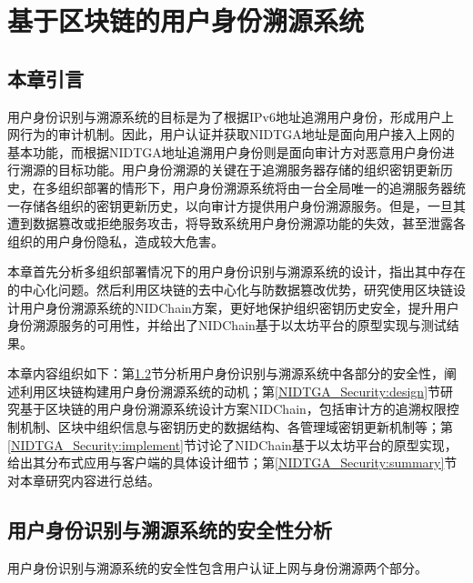 
\chapter{基于区块链的用户身份溯源系统}
\label{NIDTGA_Security}

  \section{本章引言}
  \label{NIDTGA_Security:introduction}
  用户身份识别与溯源系统的目标是为了根据IPv6地址追溯用户身份，形成用户上网行为的审计机制。因此，用户认证并获取NIDTGA地址是面向用户接入上网的基本功能，而根据NIDTGA地址追溯用户身份则是面向审计方对恶意用户身份进行溯源的目标功能。用户身份溯源的关键在于追溯服务器存储的组织密钥更新历史，在多组织部署的情形下，用户身份溯源系统将由一台全局唯一的追溯服务器统一存储各组织的密钥更新历史，以向审计方提供用户身份溯源服务。但是，一旦其遭到数据篡改或拒绝服务攻击，将导致系统用户身份溯源功能的失效，甚至泄露各组织的用户身份隐私，造成较大危害。
  
  本章首先分析多组织部署情况下的用户身份识别与溯源系统的设计，指出其中存在的中心化问题。然后利用区块链的去中心化与防数据篡改优势，研究使用区块链设计用户身份溯源系统的NIDChain方案，更好地保护组织密钥历史安全，提升用户身份溯源服务的可用性，并给出了NIDChain基于以太坊平台的原型实现与测试结果。

  本章内容组织如下：第\ref{NIDTGA_Security:analysis}节分析用户身份识别与溯源系统中各部分的安全性，阐述利用区块链构建用户身份溯源系统的动机；第\ref{NIDTGA_Security:design}节研究基于区块链的用户身份溯源系统设计方案NIDChain，包括审计方的追溯权限控制机制、区块中组织信息与密钥历史的数据结构、各管理域密钥更新机制等；第\ref{NIDTGA_Security:implement}节讨论了NIDChain基于以太坊平台的原型实现，给出其分布式应用与客户端的具体设计细节；第\ref{NIDTGA_Security:summary}节对本章研究内容进行总结。

  \section{用户身份识别与溯源系统的安全性分析}
  \label{NIDTGA_Security:analysis}

  用户身份识别与溯源系统的安全性包含用户认证上网与身份溯源两个部分。

